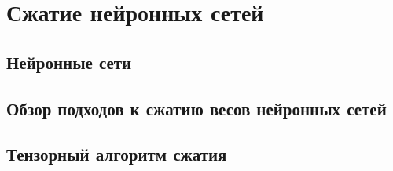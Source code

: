 \chapter{Сжатие нейронных сетей} \label{chap:cnn}
\section{Нейронные сети} \label{sec:cnn}
\section{Обзор подходов к сжатию весов нейронных сетей} \label{sec:cnn-approaches}
\section{Тензорный алгоритм сжатия} \label{sec:tt-cnn}
